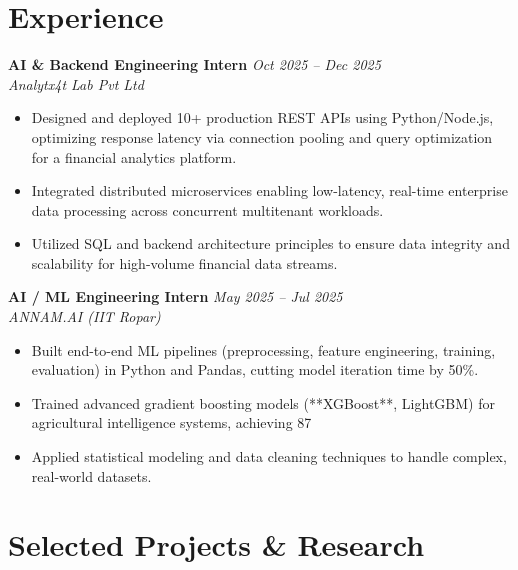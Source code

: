 \documentclass[10pt, letterpaper]{article}
\begin{document}
\section*{Experience}

\textbf{AI & Backend Engineering Intern} \hfill \emph{Oct 2025 – Dec 2025} \\
\textit{Analytx4t Lab Pvt Ltd}
\begin{itemize}[leftmargin=*, itemsep=2pt]
    \item Designed and deployed 10+ production REST APIs using Python/Node.js, optimizing response latency via connection pooling and query optimization for a financial analytics platform.
    \item Integrated distributed microservices enabling low-latency, real-time enterprise data processing across concurrent multitenant workloads.
    \item Utilized SQL and backend architecture principles to ensure data integrity and scalability for high-volume financial data streams.
\end{itemize}

\vspace{6pt}

\textbf{AI / ML Engineering Intern} \hfill \emph{May 2025 – Jul 2025} \\
\textit{ANNAM.AI (IIT Ropar)}
\begin{itemize}[leftmargin=*, itemsep=2pt]
    \item Built end-to-end ML pipelines (preprocessing, feature engineering, training, evaluation) in Python and Pandas, cutting model iteration time by 50\%.
    \item Trained advanced gradient boosting models (**XGBoost**, LightGBM) for agricultural intelligence systems, achieving 87%
    \item Applied statistical modeling and data cleaning techniques to handle complex, real-world datasets.
\end{itemize}

\section*{Selected Projects & Research}
\end{document}
